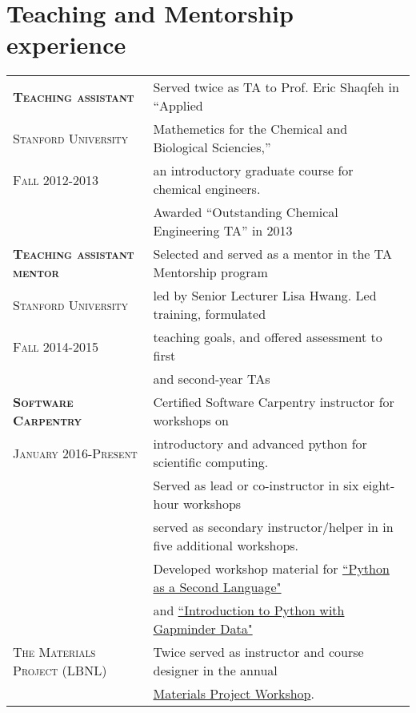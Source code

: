 \documentclass[a4paper,10pt]{article}
\begin{document}
\section{Teaching and Mentorship experience}
\begin{tabular}{ll}
  \textsc{\textbf{Teaching assistant}}
 & Served twice as TA to Prof. Eric Shaqfeh in ``Applied  \\
  \textsc{Stanford University} &Mathemetics for the Chemical and Biological Sciencies,'' \\
 \textsc{Fall 2012-2013} &an introductory graduate course for chemical engineers. \vspace{0.05in} \\
 &Awarded ``Outstanding Chemical Engineering TA'' in 2013\vspace{0.1in}\\

  \textsc{\textbf{Teaching assistant mentor}}
 & Selected and served as a mentor in the TA Mentorship program \\
  \textsc{Stanford University} & led by Senior Lecturer Lisa Hwang. Led training, formulated  \\
 \textsc{Fall 2014-2015} & teaching goals, and offered assessment to first  \\
& and second-year TAs \vspace{0.1in}\\

 \textsc{\textbf{Software Carpentry}}
  &Certified Software Carpentry instructor for workshops on  \\
\textsc{January 2016-Present} &introductory and advanced python for scientific computing. \vspace{0.05in} \\
 &Served as lead or co-instructor in six eight-hour workshops \vspace{0.05in} \\ 
 & served as secondary instructor/helper in in five additional workshops. \vspace{0.05in} \\
 &Developed workshop material for \href{https://swcarpentry.github.io/python-second-language/}{``Python as a Second Language"}\vspace{0.05in} \\
 &and \href{https://swcarpentry.github.io/python-novice-gapminder/}{``Introduction to Python with Gapminder Data"}\vspace{0.05in} \\ 

\textsc{The Materials Project (LBNL)} &Twice served as instructor and course designer  in the annual \\
 &\href{https://github.com/materialsproject/workshop-2017}{Materials Project Workshop}. \vspace{0.05in}\\

 \end{tabular}
\end{document}
